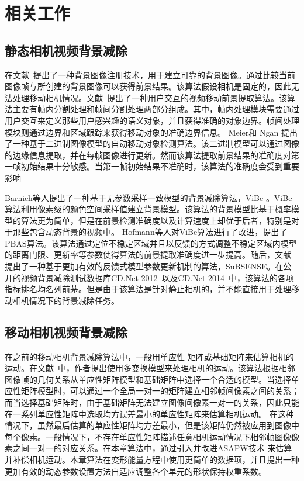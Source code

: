  \section{相关工作}
 \label{ch4:sec:relatedWorks}

 \subsection{静态相机视频背景减除}
 \label{ch4:sec:sub:scbs}

 在文献~提出了一种背景图像注册技术，用于建立可靠的背景图像。通过比较当前图像帧与所创建的背景图像可以获得前景结果。该算法假设相机是固定的，因此无法处理移动相机情况。文献~提出了一种用户交互的视频移动前景提取算法。该算法主要有帧内分割处理和帧间分割处理两部分组成。其中，帧内处理模块需要通过用户交互来定义那些用户感兴趣的语义对象，并且获得准确的对象边界。帧间处理模块则通过边界和区域跟踪来获得移动对象的准确边界信息。 Meier和 Ngan\cite{Meier1998Automatic} 提出了一种基于二进制图像模型的自动移动对象检测算法。该二进制模型可以通过图像的边缘信息提取，并在每帧图像进行更新。然而该算法提取前景结果的准确度对第一帧初始结果十分敏感。当第一帧初始结果不准确时，该算法的准确度会受到重要影响 \par
Barnich等人提出了一种基于无参数采样一致模型的背景减除算法，ViBe \cite{Barnich2011ViBe}。ViBe算法利用像素级的颜色空间采样值建立背景模型。该算法的背景模型比基于概率模型的算法\cite{GMMPAMI}更为简单，但是在前景检测准确度以及计算速度上却优于后者，特别是对于那些包含动态背景的视频中。 Hofmann等人对ViBe算法进行了改进，提出了PBAS算法。该算法通过定位不稳定区域并且以反馈的方式调整不稳定区域内模型的距离门限、更新率等参数使得算法的前景提取准确度进一步提高。随后，文献 提出了一种基于更加有效的反馈式模型参数更新机制的算法，SuBSENSE。在公开的视频背景减除测试数据库CD.Net 2012~\cite{CDNet2012}以及CD.Net 2014~\cite{CD2014}中，该算法的各项指标排名均名列前茅。但是由于该算法是针对静止相机的，并不能直接用于处理移动相机情况下的背景减除任务。\par

\subsection{移动相机视频背景减除}
\label{ch4:sec:sub:mcbs}
在之前的移动相机背景减除算法中，一般用单应性 矩阵或基础矩阵来估算相机的运动。在文献~中，作者提出使用多变换模型来处理相机的运动。该算法根据相邻图像帧的几何关系从单应性矩阵模型和基础矩阵中选择一个合适的模型。当选择单应性矩阵模型时，可以通过一个全局一对一的矩阵建立相邻帧间像素之间的关系；而当选择基础矩阵时，由于基础矩阵无法建立图像间像素一对一的关系，因此只能在一系列单应性矩阵中选取均方误差最小的单应性矩阵来估算相机运动。 在这种情况下，虽然最后估算的单应性矩阵均方差最小，但是该矩阵仍然被应用到图像中每个像素。一般情况下，不存在单应性矩阵描述任意相机运动情况下相邻帧图像像素之间一对一的对应关系。在本章算法中，通过引入并改进ASAPW技术 \cite{Liu2009ASAP,Liu_2013ASAP}来估算并补偿相机运动。本章算法在变形能量方程中使用更简单的数据项，并且提出一种更加有效的动态参数设置方法自适应调整各个单元的形状保持权重系数。 \par

